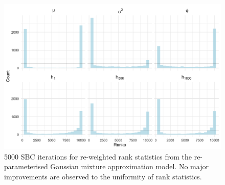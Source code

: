 \documentclass[12pt, a4paper]{article}
\begin{document}
\begin{figure}[H]
    \centering
    \includegraphics[scale=0.09]{results/weighted_ksc_ncp_5k.png}
    \caption{5000 SBC iterations for re-weighted rank statistics from the re-parameterised Gaussian mixture approximation model. No major improvements are observed to the uniformity of rank statistics.}
    \label{fig:ncpreweight5k}
\end{figure}
\end{document}
